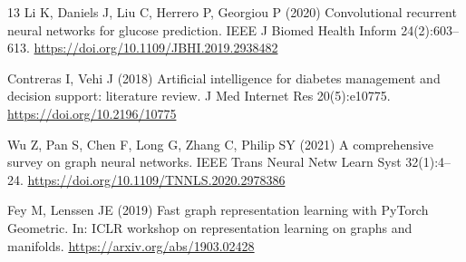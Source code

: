 \documentclass[10pt,a4paper]{article}
\begin{document}
\begin{thebibliography}{13}
Li K, Daniels J, Liu C, Herrero P, Georgiou P (2020) Convolutional recurrent neural networks for glucose prediction. IEEE J Biomed Health Inform 24(2):603--613. \url{https://doi.org/10.1109/JBHI.2019.2938482}

Contreras I, Vehi J (2018) Artificial intelligence for diabetes management and decision support: literature review. J Med Internet Res 20(5):e10775. \url{https://doi.org/10.2196/10775}

Wu Z, Pan S, Chen F, Long G, Zhang C, Philip SY (2021) A comprehensive survey on graph neural networks. IEEE Trans Neural Netw Learn Syst 32(1):4--24. \url{https://doi.org/10.1109/TNNLS.2020.2978386}

Fey M, Lenssen JE (2019) Fast graph representation learning with PyTorch Geometric. In: ICLR workshop on representation learning on graphs and manifolds. \url{https://arxiv.org/abs/1903.02428}

\end{thebibliography}
\end{document}
